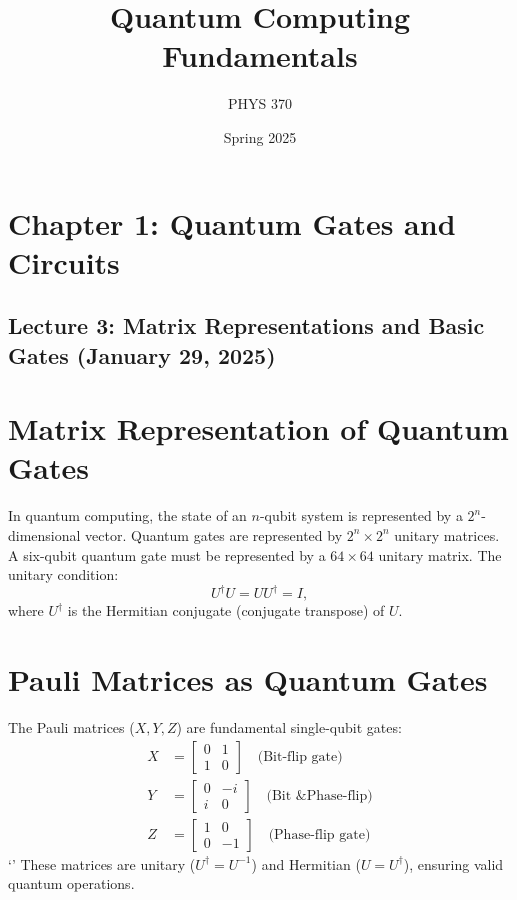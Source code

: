\documentclass{article}
\title{Quantum Computing Fundamentals}
\author{PHYS 370}
\date{Spring 2025}
\begin{document}
\maketitle

\tableofcontents
\newpage

\section*{Chapter 1: Quantum Gates and Circuits}
\subsection*{Lecture 3: Matrix Representations and Basic Gates (January 29, 2025)}

\section{Matrix Representation of Quantum Gates}
In quantum computing, the state of an \(n\)-qubit system is represented by a \(2^n\)-dimensional vector. Quantum gates are represented by \(2^n \times 2^n\) unitary matrices. A six-qubit quantum gate must be represented by a \(64 \times 64\) unitary matrix. The unitary condition:
\[
U^{\dagger}U = U U^{\dagger} = I,
\]
where \(U^{\dagger}\) is the Hermitian conjugate (conjugate transpose) of \(U\).

\section{Pauli Matrices as Quantum Gates}
The Pauli matrices (\(X, Y, Z\)) are fundamental single-qubit gates:
\begin{align*}
X & = \begin{bmatrix} 0 & 1 \\ 1 & 0 \end{bmatrix} \quad \text{(Bit-flip gate)} \\
Y & = \begin{bmatrix} 0 & -i \\ i & 0 \end{bmatrix} \quad \text{(Bit \& Phase-flip)} \\
Z & = \begin{bmatrix} 1 & 0 \\ 0 & -1 \end{bmatrix} \quad \text{(Phase-flip gate)}
\end{align*}`'
These matrices are unitary (\(U^{\dagger} = U^{-1}\)) and Hermitian (\(U = U^{\dagger}\)), ensuring valid quantum operations.
\end{document}
